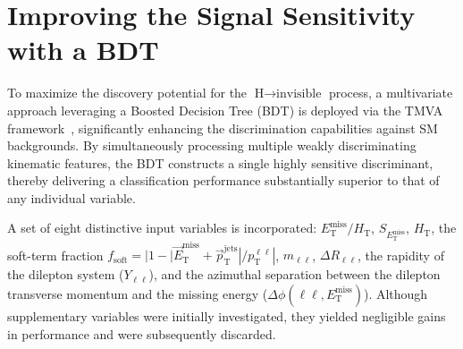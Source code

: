 

\section{Improving the Signal Sensitivity with a BDT}

To maximize the discovery potential for the $\text{H} \to \text{invisible}$ process, a multivariate approach leveraging a Boosted Decision Tree (BDT) is deployed via the TMVA framework~\cite{Hoecker:2007tmva}, significantly enhancing the discrimination capabilities against SM backgrounds. By simultaneously processing multiple weakly discriminating kinematic features, the BDT constructs a single highly sensitive discriminant, thereby delivering a classification performance substantially superior to that of any individual variable.

A set of eight distinctive input variables is incorporated: $E_{\text{T}}^{\text{miss}}/H_{\text{T}}$, $S_{E_{\text{T}}^{\text{miss}}}$, $H_{\text{T}}$, the soft-term fraction $f_{\text{soft}} = |1 - |\vec{E}_{\text{T}}^{\text{miss}} + \vec{p}_{\text{T}}^{\text{jets}}| / p_{\text{T}}^{\ell\ell}|$, $m_{\ell\ell}$, $\Delta R_{\ell\ell}$, the rapidity of the dilepton system ($Y_{\ell\ell}$), and the azimuthal separation between the dilepton transverse momentum and the missing energy ($\Delta\phi(\ell\ell, E_{\text{T}}^{\text{miss}})$). Although supplementary variables were initially investigated, they yielded negligible gains in performance and were subsequently discarded.

